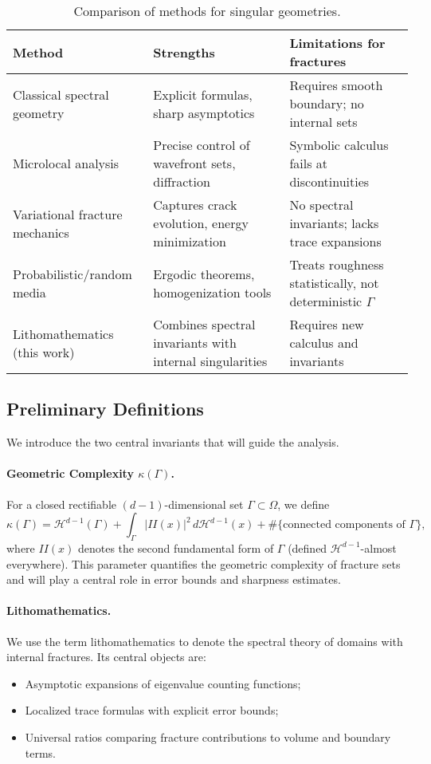 \begin{table}[h]
\centering
\begin{tabular}{|p{4cm}|p{5cm}|p{5cm}|}
\hline
\textbf{Method} & \textbf{Strengths} & \textbf{Limitations for fractures} \\
\hline
Classical spectral geometry 
& Explicit formulas, sharp asymptotics 
& Requires smooth boundary; no internal sets \\
\hline
Microlocal analysis 
& Precise control of wavefront sets, diffraction 
& Symbolic calculus fails at discontinuities \\
\hline
Variational fracture mechanics 
& Captures crack evolution, energy minimization 
& No spectral invariants; lacks trace expansions \\
\hline
Probabilistic/random media 
& Ergodic theorems, homogenization tools 
& Treats roughness statistically, not deterministic $\Gamma$ \\
\hline
Lithomathematics (this work) 
& Combines spectral invariants with internal singularities 
& Requires new calculus and invariants \\
\hline
\end{tabular}
\caption{Comparison of methods for singular geometries.}
\end{table}

\subsection{Preliminary Definitions}

We introduce the two central invariants that will guide the analysis.

\paragraph{Geometric Complexity $\kappa(\Gamma)$.}
For a closed rectifiable $(d-1)$-dimensional set $\Gamma \subset \Omega$, 
we define
\[
\kappa(\Gamma) = \mathcal{H}^{d-1}(\Gamma) + 
\int_\Gamma |II(x)|^2 \, d\mathcal{H}^{d-1}(x) + \#\{\text{connected components of } \Gamma\},
\]
where $II(x)$ denotes the second fundamental form of $\Gamma$ 
(defined $\mathcal{H}^{d-1}$-almost everywhere).
This parameter quantifies the geometric complexity of fracture sets 
and will play a central role in error bounds and sharpness estimates.

\paragraph{Lithomathematics.}
We use the term lithomathematics to denote the spectral theory of domains 
with internal fractures. Its central objects are:
\begin{itemize}
\item Asymptotic expansions of eigenvalue counting functions;
\item Localized trace formulas with explicit error bounds;
\item Universal ratios comparing fracture contributions to volume and boundary terms.
\end{itemize}

